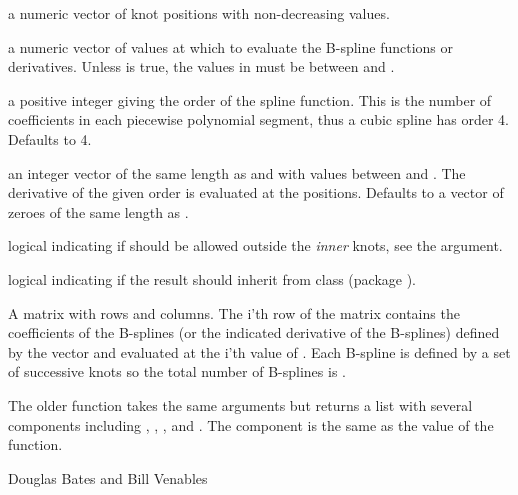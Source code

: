 %
\begin{Arguments}
\begin{ldescription}
\item[\code{knots}] a numeric vector of knot positions with non-decreasing
values.
\item[\code{x}] a numeric vector of values at which to evaluate the B-spline
functions or derivatives.  Unless  is true, the
values in  must be between  and
.
\item[\code{ord}] a positive integer giving the order of the spline function.
This is the number of coefficients in each piecewise polynomial
segment, thus a cubic spline has order 4.  Defaults to 4.
\item[\code{derivs}] an integer vector of the same length as  and with
values between  and .  The derivative of the
given order is evaluated at the  positions.  Defaults to a
vector of zeroes of the same length as .
\item[\code{outer.ok}] logical indicating if  should be allowed
outside the \emph{inner} knots, see the  argument.
\item[\code{sparse}] logical indicating if the result should inherit from class
 (package ).
\end{ldescription}
\end{Arguments}
%
\begin{Value}
A matrix with  rows and 
columns.  The i'th row of the matrix contains the coefficients of the
B-splines (or the indicated derivative of the B-splines) defined by
the  vector and evaluated at the i'th value of .
Each B-spline is defined by a set of  successive knots so
the total number of B-splines is .
\end{Value}
%
\begin{Note}\relax
The older  function takes the same arguments but
returns a list with several components including ,
, , and .  The 
component is the same as the value of the 
function.
\end{Note}
%
\begin{Author}\relax
Douglas Bates and Bill Venables
\end{Author}
%
